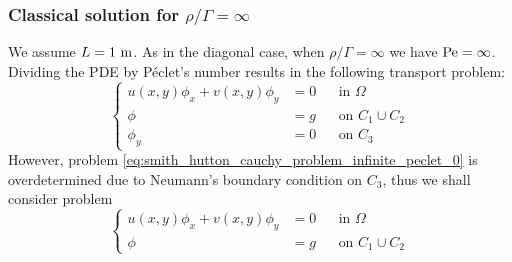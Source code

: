 \subsubsection{Classical solution for \texorpdfstring{$\rho / \Gamma =
\infty$}{infinite rho/Gamma quotient}}

We assume $L = 1 \ \meter$. As in the diagonal case, when $\rho / \Gamma =
\infty$ we have $\peclet = \infty$. Dividing the PDE by Péclet's number results
in the following transport problem:
\begin{equation} \label{eq:smith_hutton_cauchy_problem_infinite_peclet_0} 
	\left\{
	\begin{aligned}
		u(x,y) \phi_x + v(x,y) \phi_y &= 0 	& &\text{in } \Omega \\
		\phi &= g 							& &\text{on } C_1 \cup C_2 \\
		\phi_y &= 0 						& &\text{on } C_3
	\end{aligned}
	\right.
\end{equation}
However, problem \eqref{eq:smith_hutton_cauchy_problem_infinite_peclet_0} is
overdetermined due to Neumann's boundary condition on $C_3$, thus we shall consider problem
\begin{equation} \label{eq:smith_hutton_cauchy_problem_infinite_peclet} 
	\left\{
	\begin{aligned}
		u(x,y) \phi_x + v(x,y) \phi_y &= 0 	& &\text{in } \Omega \\
		\phi &= g 							& &\text{on } C_1 \cup C_2
	\end{aligned}
	\right.
\end{equation}

